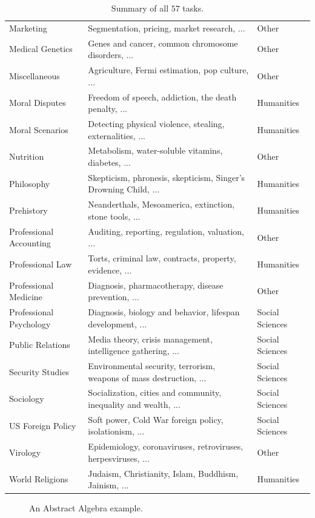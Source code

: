 \documentclass{article}
\begin{document}
\begin{table}[h]
{\begin{tabular}{lll}
Marketing & Segmentation, pricing, market research, ... & Other \\
Medical Genetics & Genes and cancer, common chromosome disorders, ... & Other \\
Miscellaneous & Agriculture, Fermi estimation, pop culture, ... & Other \\
Moral Disputes & Freedom of speech, addiction, the death penalty, ... & Humanities \\
Moral Scenarios & Detecting physical violence, stealing, externalities, ... & Humanities \\
Nutrition & Metabolism, water-soluble vitamins, diabetes, ... & Other \\
Philosophy & Skepticism, phronesis, skepticism, Singer's Drowning Child, ... & Humanities \\
Prehistory & Neanderthals, Mesoamerica, extinction, stone tools, ... & Humanities \\
Professional Accounting & Auditing, reporting, regulation, valuation, ... & Other \\
Professional Law &  Torts, criminal law, contracts, property, evidence, ... & Humanities \\
Professional Medicine & Diagnosis, pharmacotherapy, disease prevention, ... & Other \\
Professional Psychology & Diagnosis, biology and behavior, lifespan development, ... & Social Sciences \\
Public Relations & Media theory, crisis management, intelligence gathering, ... & Social Sciences \\
Security Studies & Environmental security, terrorism, weapons of mass destruction, ... & Social Sciences \\
Sociology & Socialization, cities and community, inequality and wealth, ... & Social Sciences \\
US Foreign Policy & Soft power, Cold War foreign policy, isolationism, ... & Social Sciences \\
Virology & Epidemiology, coronaviruses, retroviruses, herpesviruses, ... & Other \\
World Religions & Judaism, Christianity, Islam, Buddhism, Jainism, ... & Humanities\\
\hline
\end{tabular}}
\caption{Summary of all $57$ tasks.}
\label{tab:datasetdescriptions}
\end{table}

\clearpage
\begin{figure}
\centering
{}
    \caption{An Abstract Algebra example.}
    \label{fig:abstractalgebraexample}
\end{figure}
\end{document}
